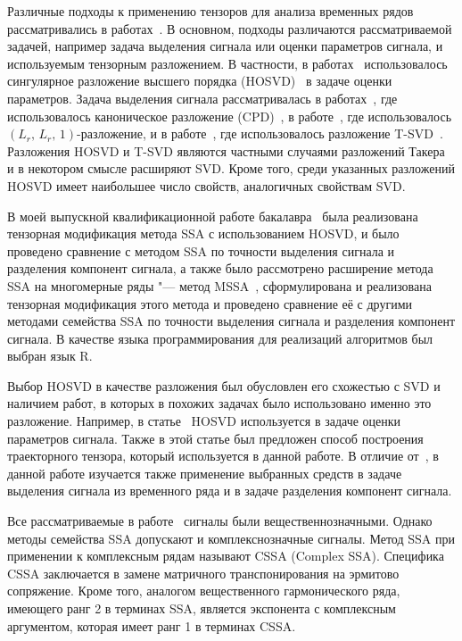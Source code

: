 \documentclass[specialist,
  substylefile = spbu.rtx,
subf,href,colorlinks=true, 12pt]{disser}
\theoremstyle{plain}
\theoremstyle{definition}
\theoremstyle{remark}
\begin{document}
Различные подходы к применению тензоров для анализа временных рядов
рассматривались в
работах~\cite{hosvd-hooi-separation,Papy2009,TSSA,TSSA-improved,DeLathauwer2011,TrungLe2024}.
В основном, подходы различаются рассматриваемой задачей, например
задача выделения сигнала или оценки параметров сигнала, и
используемым тензорным разложением.
В частности, в работах~\cite{hosvd-hooi-separation,Papy2009} использовалось
сингулярное разложение высшего порядка (HOSVD)~\cite{hosvd} в задаче
оценки параметров.
Задача выделения сигнала рассматривалась в
работах~\cite{TSSA,TSSA-improved}, где использовалось
каноническое разложение (CPD)~\cite{parafac1, parafac2},
в работе~\cite{DeLathauwer2011}, где использовалось $(L_r,\, L_r,\,
1)$-разложение, и в работе~\cite{TrungLe2024}, где использовалось
разложение T-SVD~\cite{Kilmer2011,Kilmer2013}.
Разложения HOSVD и T-SVD являются частными случаями разложений
Такера~\cite{tucker} и в некотором смысле расширяют SVD. Кроме того,
среди указанных разложений HOSVD имеет наибольшее число свойств,
аналогичных свойствам SVD.

В моей выпускной квалификационной работе бакалавра~\cite{Thesis2024} была
реализована тензорная модификация метода SSA с использованием
HOSVD, и было проведено сравнение с методом SSA по точности выделения
сигнала и разделения компонент сигнала, а также было рассмотрено
расширение метода SSA на многомерные ряды "--- метод
MSSA~\cite{ssa-2020}, сформулирована и реализована тензорная
модификация этого метода и проведено сравнение её с другими методами
семейства SSA по точности выделения сигнала и разделения компонент сигнала.
В качестве языка программирования для реализаций алгоритмов был выбран язык R.

Выбор HOSVD в качестве разложения был обусловлен его схожестью с SVD
и наличием работ, в которых в похожих задачах было использовано
именно это разложение. Например, в
статье~\cite{hosvd-hooi-separation} HOSVD используется в задаче
оценки параметров сигнала. Также в этой статье был предложен способ
построения траекторного тензора, который используется в данной работе.
В отличие от~\cite{hosvd-hooi-separation}, в данной работе изучается
также применение выбранных средств в задаче выделения сигнала из
временного ряда и в задаче разделения компонент сигнала.

Все рассматриваемые в работе~\cite{Thesis2024} сигналы были вещественнозначными.
Однако методы семейства SSA допускают и комплекснозначные сигналы.
Метод SSA при применении к комплексным рядам называют CSSA (Complex SSA).
Специфика CSSA заключается в замене матричного
транспонирования на эрмитово сопряжение.
Кроме того, аналогом вещественного гармонического ряда,
имеющего ранг 2 в терминах SSA, является экспонента с комплексным
аргументом, которая имеет ранг 1 в терминах CSSA.
\end{document}
